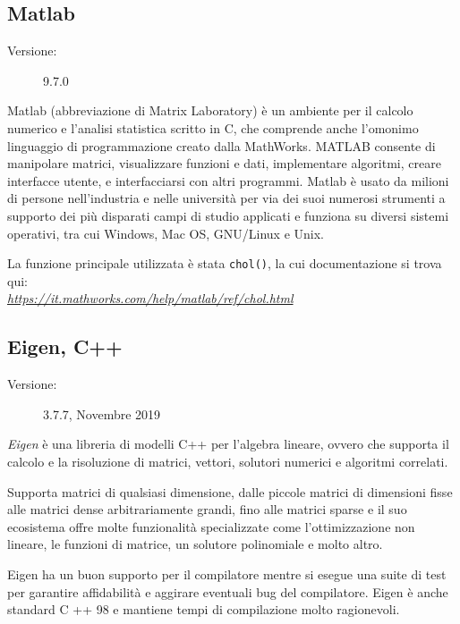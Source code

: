 \documentclass[preprint,12pt]{elsarticle}
\begin{document}
\subsection{Matlab}
\medskip
\begin{description}
	\item[Versione:] 9.7.0
\end{description}

Matlab (abbreviazione di Matrix Laboratory) è un ambiente per il calcolo numerico e l'analisi statistica scritto in C, che comprende anche l'omonimo linguaggio di programmazione creato dalla MathWorks. MATLAB consente di manipolare matrici, visualizzare funzioni e dati, implementare algoritmi, creare interfacce utente, e interfacciarsi con altri programmi. Matlab è usato da milioni di persone nell'industria e nelle università per via dei suoi numerosi strumenti a supporto dei più disparati campi di studio applicati e funziona su diversi sistemi operativi, tra cui Windows, Mac OS, GNU/Linux e Unix.

La funzione principale utilizzata è stata \texttt{chol()}, la cui documentazione si trova qui:\\
\textit{\href{https://it.mathworks.com/help/matlab/ref/chol.html}{https://it.mathworks.com/help/matlab/ref/chol.html}}

\subsection{Eigen, C++}
\medskip
\begin{description}
	\item[Versione:] 3.7.7, Novembre 2019
\end{description}

\textit{Eigen} è una libreria di modelli C++ per l'algebra lineare, ovvero che supporta il calcolo e la risoluzione di matrici, vettori, solutori numerici e algoritmi correlati.

Supporta matrici di qualsiasi dimensione, dalle piccole matrici di dimensioni fisse alle matrici dense arbitrariamente grandi, fino alle matrici sparse e il suo ecosistema offre molte funzionalità specializzate come l'ottimizzazione non lineare, le funzioni di matrice, un solutore polinomiale e molto altro.

Eigen ha un buon supporto per il compilatore mentre si esegue una suite di test per garantire affidabilità e aggirare eventuali bug del compilatore. Eigen è anche standard C ++ 98 e mantiene tempi di compilazione molto ragionevoli.
\end{document}

